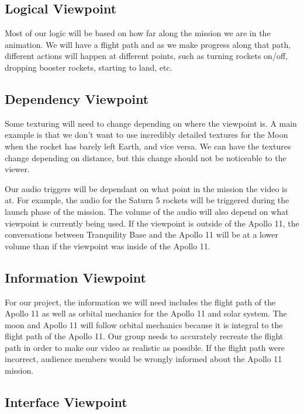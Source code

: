 \documentclass[onecolumn, draftclsnofoot,10pt, compsoc]{IEEEtran}
\begin{document}
    \subsection{Logical Viewpoint}

    Most of our logic will be based on how far along the mission we are in the animation. We will have a flight path and as we make progress along that path, different actions will happen at different points, such as turning rockets on/off, dropping booster rockets, starting to land, etc. 
    
    \subsection{Dependency Viewpoint}

    Some texturing will need to change depending on where the viewpoint is. A main example is that we don't want to use incredibly detailed textures for the Moon when the rocket has barely left Earth, and vice versa. We can have the textures change depending on distance, but this change should not be noticeable to the viewer.
    
    Our audio triggers will be dependant on what point in the mission the video is at. For example, the audio for the Saturn 5 rockets will be triggered during the launch phase of the mission. The volume of the audio will also depend on what viewpoint is currently being used. If the viewpoint is outside of the Apollo 11, the conversations between Tranquility Base and the Apollo 11 will be at a lower volume than if the viewpoint was inside of the Apollo 11.
    
    \subsection{Information Viewpoint}
    For our project, the information we will need includes the flight path of the Apollo 11 as well as orbital mechanics for the Apollo 11 and solar system. The moon and Apollo 11 will follow orbital mechanics because it is integral to the flight path of the Apollo 11. Our group needs to accurately recreate the flight path in order to make our video as realistic as possible. If the flight path were incorrect, audience members would be wrongly informed about the Apollo 11 mission.

    \subsection{Interface Viewpoint}
       
\end{document}
